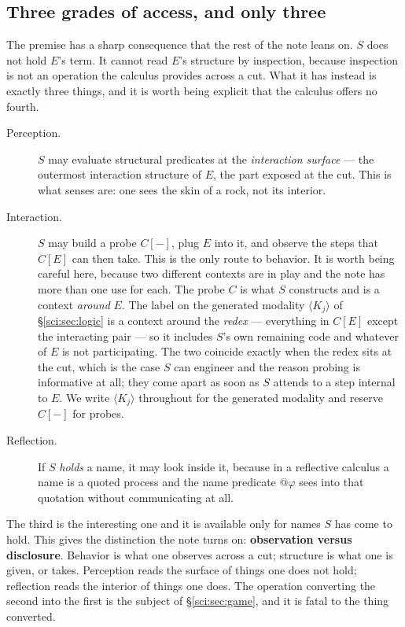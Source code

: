 \subsection{Three grades of access, and only three}\label{sci:S2.2}

The premise has a sharp consequence that the rest of the note leans on. $S$ does not hold $E$'s term.
It cannot read $E$'s structure by inspection, because inspection is not an operation the calculus
provides across a cut. What it has instead is exactly three things, and it is worth being explicit
that the calculus offers no fourth.

\begin{description}
\item[Perception.] $S$ may evaluate structural predicates at the \emph{interaction surface} --- the
outermost interaction structure of $E$, the part exposed at the cut. This is what senses are: one
sees the skin of a rock, not its interior.
\item[Interaction.] $S$ may build a probe $C[-]$, plug $E$ into it, and observe the steps that
$C[E]$ can then take. This is the only route to behavior. It is worth being careful here, because
two different contexts are in play and the note has more than one use for each. The probe $C$ is
what $S$ constructs and is a context \emph{around} $E$. The label on the generated modality
$\langle K_j \rangle$ of \S\ref{sci:sec:logic} is a context around the \emph{redex} --- everything in
$C[E]$ except the interacting pair --- so it includes $S$'s own remaining code and whatever of $E$
is not participating. The two coincide exactly when the redex sits at the cut, which is the case
$S$ can engineer and the reason probing is informative at all; they come apart as soon as $S$
attends to a step internal to $E$. We write $\langle K_j \rangle$ throughout for the generated
modality and reserve $C[-]$ for probes.
\item[Reflection.] If $S$ \emph{holds} a name, it may look inside it, because in a reflective calculus
a name is a quoted process and the name predicate $@\varphi$ sees into that quotation without
communicating at all.
\end{description}

The third is the interesting one and it is available only for names $S$ has come to hold. This gives
the distinction the note turns on: \textbf{observation versus disclosure}. Behavior is what one
observes across a cut; structure is what one is given, or takes. Perception reads the surface of
things one does not hold; reflection reads the interior of things one does. The operation converting
the second into the first is the subject of \S\ref{sci:sec:game}, and it is fatal to the thing converted.

